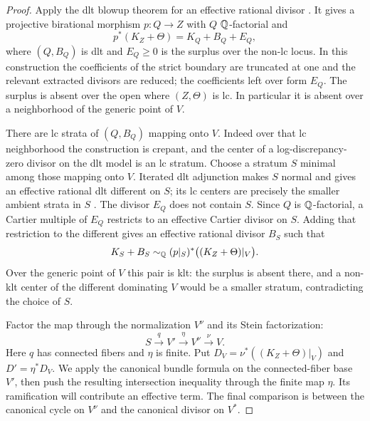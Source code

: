 \begin{proof}
Apply the dlt blowup theorem for an effective rational divisor
\cite[Theorem~2.10]{FujinoHashizume2023}. It gives a projective
birational morphism $p:Q\to Z$ with $Q$ $\mathbb{Q}$-factorial and
\begin{equation}
\label{common:subadjunction-surplus}
 p^*(K_Z+\Theta)=K_Q+B_Q+E_Q,
\end{equation}
where $(Q,B_Q)$ is dlt and $E_Q\geq0$ is the surplus over the
non-lc locus. In this construction the coefficients of the strict
boundary are truncated at one and the relevant extracted divisors
are reduced; the coefficients left over form $E_Q$. The surplus
is absent over the open where $(Z,\Theta)$ is lc. In particular it
is absent over a neighborhood of the generic point of $V$.

There are lc strata of $(Q,B_Q)$ mapping onto $V$. Indeed over that
lc neighborhood the construction is crepant, and the center of a
log-discrepancy-zero divisor on the dlt model is an lc stratum.
Choose a stratum $S$ minimal among those mapping onto $V$.
Iterated dlt adjunction makes $S$ normal and gives an effective
rational dlt different on $S$; its lc centers are precisely the
smaller ambient strata in $S$
\cite{Kollar2013}. The divisor $E_Q$ does not contain $S$. Since
$Q$ is $\mathbb{Q}$-factorial, a Cartier multiple of $E_Q$ restricts to an
effective Cartier divisor on $S$. Adding that restriction to the
different gives an effective rational divisor $B_S$ such that
\begin{equation}
\label{common:subadjunction-stratum}
 K_S+B_S\sim_{\mathbb{Q}}(p|_S)^*\bigl((K_Z+\Theta)|_V\bigr).
\end{equation}
Over the generic point of $V$ this pair is klt: the surplus is
absent there, and a non-klt center of the different dominating
$V$ would be a smaller stratum, contradicting the choice of $S$.

Factor the map through the normalization $V^\nu$ and its Stein
factorization:
\[
 S\xrightarrow{q}V'\xrightarrow{\eta}V^\nu\xrightarrow{\nu}V.
\]
Here $q$ has connected fibers and $\eta$ is finite. Put
$D_V=\nu^*((K_Z+\Theta)|_V)$ and
$D'=\eta^*D_V$. We apply the canonical bundle formula on the
connected-fiber base $V'$, then push the resulting intersection
inequality through the finite map $\eta$. Its ramification will
contribute an effective term. The final comparison is between the
canonical cycle on $V^\nu$ and the canonical divisor on $V^*$.


\end{proof}
